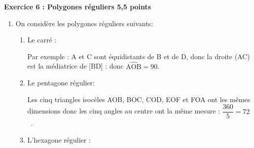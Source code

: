 \textbf{Exercice 6 : Polygones réguliers \hfill 5,5 points}

\medskip

\begin{enumerate}
\item On considère les polygones réguliers suivants:
	\begin{enumerate}
		\item Le carré :
		
Par exemple : A et C sont équidistants de B et de D, donc la droite (AC) est la médiatrice de [BD] : donc $\widehat{\text{AOB}}= 90$\degres.
		\item Le pentagone régulier:

%
%
Les cinq triangles isocèles AOB, BOC, COD, EOF et FOA ont les mêmes dimensions donc les cinq angles au centre ont la même mesure : $\dfrac{360}{5} = 72$~\degres.
		\item L'hexagone régulier :


\end{enumerate}
\end{enumerate}
